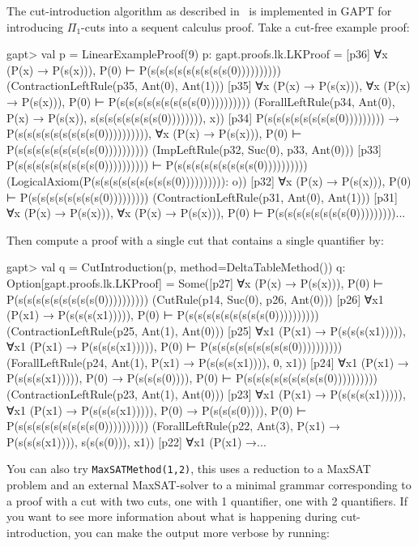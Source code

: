 \documentclass[a4paper,11pt]{book}
\begin{document}
The cut-introduction algorithm as described in~\cite{Hetzl2012,Hetzl14Algorithmic,Hetzl14Introducing} is
implemented in GAPT for introducing $\Pi_1$-cuts into a sequent calculus
proof. Take a cut-free example proof:
\begin{clilisting}
gapt> val p = LinearExampleProof(9)
p: gapt.proofs.lk.LKProof =
[p36] ∀x (P(x) → P(s(x))), P(0) ⊢ P(s(s(s(s(s(s(s(s(s(0))))))))))    (ContractionLeftRule(p35, Ant(0), Ant(1)))
[p35] ∀x (P(x) → P(s(x))), ∀x (P(x) → P(s(x))), P(0) ⊢ P(s(s(s(s(s(s(s(s(s(0))))))))))    (ForallLeftRule(p34, Ant(0), P(x) → P(s(x)), s(s(s(s(s(s(s(s(0)))))))), x))
[p34] P(s(s(s(s(s(s(s(s(0))))))))) → P(s(s(s(s(s(s(s(s(s(0)))))))))),
∀x (P(x) → P(s(x))),
P(0)
⊢
P(s(s(s(s(s(s(s(s(s(0))))))))))    (ImpLeftRule(p32, Suc(0), p33, Ant(0)))
[p33] P(s(s(s(s(s(s(s(s(s(0)))))))))) ⊢ P(s(s(s(s(s(s(s(s(s(0))))))))))    (LogicalAxiom(P(s(s(s(s(s(s(s(s(s(0)))))))))): o))
[p32] ∀x (P(x) → P(s(x))), P(0) ⊢ P(s(s(s(s(s(s(s(s(0)))))))))    (ContractionLeftRule(p31, Ant(0), Ant(1)))
[p31] ∀x (P(x) → P(s(x))), ∀x (P(x) → P(s(x))), P(0) ⊢ P(s(s(s(s(s(s(s(s(0)))))))))...

\end{clilisting}
Then compute a proof with a single cut that contains a single quantifier by:
\begin{clilisting}
gapt> val q = CutIntroduction(p, method=DeltaTableMethod())
q: Option[gapt.proofs.lk.LKProof] =
Some([p27] ∀x (P(x) → P(s(x))), P(0) ⊢ P(s(s(s(s(s(s(s(s(s(0))))))))))    (CutRule(p14, Suc(0), p26, Ant(0)))
[p26] ∀x1 (P(x1) → P(s(s(s(x1))))), P(0) ⊢ P(s(s(s(s(s(s(s(s(s(0))))))))))    (ContractionLeftRule(p25, Ant(1), Ant(0)))
[p25] ∀x1 (P(x1) → P(s(s(s(x1))))),
∀x1 (P(x1) → P(s(s(s(x1))))),
P(0)
⊢
P(s(s(s(s(s(s(s(s(s(0))))))))))    (ForallLeftRule(p24, Ant(1), P(x1) → P(s(s(s(x1)))), 0, x1))
[p24] ∀x1 (P(x1) → P(s(s(s(x1))))),
P(0) → P(s(s(s(0)))),
P(0)
⊢
P(s(s(s(s(s(s(s(s(s(0))))))))))    (ContractionLeftRule(p23, Ant(1), Ant(0)))
[p23] ∀x1 (P(x1) → P(s(s(s(x1))))),
∀x1 (P(x1) → P(s(s(s(x1))))),
P(0) → P(s(s(s(0)))),
P(0)
⊢
P(s(s(s(s(s(s(s(s(s(0))))))))))    (ForallLeftRule(p22, Ant(3), P(x1) → P(s(s(s(x1)))), s(s(s(0))), x1))
[p22] ∀x1 (P(x1) →...

\end{clilisting}

You can also try \texttt{MaxSATMethod(1,2)}, this uses a reduction to a MaxSAT
problem and an external MaxSAT-solver to a
minimal grammar corresponding to a proof with a cut with two cuts, one with 1
quantifier, one with 2 quantifiers.  If you want to see more information
about what is happening during cut-introduction, you can make the output more
verbose by running:
\end{document}
